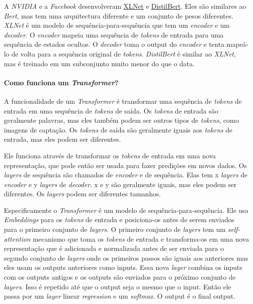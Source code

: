 A \textit{NVIDIA} e a \textit{Facebook} desenvolveram \href{https://arxiv.org/abs/1906.08237}{XLNet} e \href{https://arxiv.org/abs/1810.04805}{DistilBert}. Eles são similares ao \textit{Bert}, mas tem uma arquitectura diferente e um conjunto de pesos diferentes. \textit{XLNet} é um modelo de sequência-para-sequência que tem um \textit{encoder} e um \textit{decoder}. O \textit{encoder} mapeia uma sequência de \textit{tokens} de entrada para uma sequência de estados ocultos. O \textit{decoder} toma o output do \textit{encoder} e tenta mapeá-lo de volta para a sequência original de \textit{tokens}. \textit{DistilBert} é similar ao \textit{XLNet}, mas é treinado em um subconjunto muito menor do que o data.

\paragraph{Como funciona um \textit{Transformer}?\\}

A funcionalidade de um \textit{Transformer} é transformar uma sequência de \textit{tokens} de entrada em uma sequência de \textit{tokens} de saída. Os \textit{tokens} de entrada são geralmente palavras, mas eles também podem ser outros tipos de \textit{tokens}, como imagens de captação. Os \textit{tokens} de saída são geralmente iguais aos \textit{tokens} de entrada, mas eles podem ser diferentes.

Ele funciona através de transformar os \textit{tokens} de entrada em uma nova representação, que pode então ser usada para fazer predições em novos dados. Os \textit{layers} de sequência são chamados de \textit{encoder} e de sequência. Elas tem x \textit{layers} de \textit{encoder} e y \textit{layers} de \textit{decoder}. x e y são geralmente iguais, mas eles podem ser diferentes. Os \textit{layers} podem ser diferentes tamanhos.

Especificamente o \textit{Transformer} é um modelo de sequência-para-sequência. Ele usa \textit{Embeddings} para os \textit{tokens} de entrada e posiciona-os antes de serem enviados para o primeiro conjunto de \textit{layers}. O primeiro conjunto de \textit{layers} tem um \textit{self-attention} mecanismo que toma os \textit{tokens} de entrada e transforma-os em uma nova representação que é adicionada e normalizada antes de ser enviada para o segundo conjunto de \textit{layers} onde os primeiros passos são iguais aos anteriores mas eles usam os outputs anteriores como inputs. Essa nova \textit{layer} combina os inputs com os outputs antigos e os outputs são enviados para o próximo conjunto de \textit{layers}. Isso é repetido até que o output seja o mesmo que o input. Então ele passa por um \textit{layer} linear \textit{regression} e um \textit{softmax}. O output é o final output.

